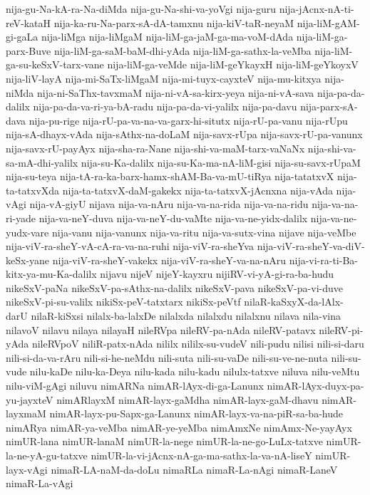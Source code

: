 {nija-gu-Na-kA-ra-Na-diMda
nija-gu-Na-shi-va-yoVgi
nija-guru
nija-jAcnx-nA-ti-reV-kataH
nija-ka-ru-Na-parx-sA-dA-tamxnu
nija-kiV-taR-neyaM
nija-liM-gAM-gi-gaLa
nija-liMga
nija-liMgaM
nija-liM-ga-jaM-ga-ma-voM-dAda
nija-liM-ga-parx-Buve
nija-liM-ga-saM-baM-dhi-yAda
nija-liM-ga-sathx-la-veMba
nija-liM-ga-su-keSxV-tarx-vane
nija-liM-ga-veMde
nija-liM-geYkayxH
nija-liM-geYkoyxV
nija-liV-layA
nija-mi-SaTx-liMgaM
nija-mi-tuyx-cayxteV
nija-mu-kitxya
nija-niMda
nija-ni-SaThx-tavxmaM
nija-ni-vA-sa-kirx-yeya
nija-ni-vA-sava
nija-pa-da-dalilx
nija-pa-da-va-ri-ya-bA-radu
nija-pa-da-vi-yalilx
nija-pa-davu
nija-parx-sA-dava
nija-pu-rige
nija-rU-pa-va-na-va-garx-hi-situtx
nija-rU-pa-vanu
nija-rUpu
nija-sA-dhayx-vAda
nija-sAthx-na-doLaM
nija-savx-rUpa
nija-savx-rU-pa-vanunx
nija-savx-rU-payAyx
nija-sha-ra-Nane
nija-shi-va-maM-tarx-vaNaNx
nija-shi-va-sa-mA-dhi-yalilx
nija-su-Ka-dalilx
nija-su-Ka-ma-nA-liM-gisi
nija-su-savx-rUpaM
nija-su-teya
nija-tA-ra-ka-barx-hamx-shAM-Ba-va-mU-tiRya
nija-tatatxvX
nija-ta-tatxvXda
nija-ta-tatxvX-daM-gakekx
nija-ta-tatxvX-jAcnxna
nija-vAda
nija-vAgi
nija-vA-giyU
nijava
nija-va-nAru
nija-va-na-rida
nija-va-na-ridu
nija-va-na-ri-yade
nija-va-neY-duva
nija-va-neY-du-vaMte
nija-va-ne-yidx-dalilx
nija-va-ne-yudx-vare
nija-vanu
nija-vanunx
nija-va-ritu
nija-va-sutx-vina
nijave
nija-veMbe
nija-viV-ra-sheY-vA-cA-ra-va-na-ruhi
nija-viV-ra-sheYva
nija-viV-ra-sheY-va-diV-keSx-yane
nija-viV-ra-sheY-vakekx
nija-viV-ra-sheY-va-na-nAru
nija-vi-ra-ti-Ba-kitx-ya-mu-Ka-dalilx
nijavu
nijeV
nijeY-kayxru
nijiRV-vi-yA-gi-ra-ba-hudu
nikeSxV-paNa
nikeSxV-pa-sAthx-na-dalilx
nikeSxV-pava
nikeSxV-pa-vi-duve
nikeSxV-pi-su-valilx
nikiSx-peV-tatxtarx
nikiSx-peVtf
nilaR-kaSxyX-da-lAlx-darU
nilaR-kiSxsi
nilalx-ba-lalxDe
nilalxda
nilalxdu
nilalxnu
nilava
nila-vina
nilavoV
nilavu
nilaya
nilayaH
nileRVpa
nileRV-pa-nAda
nileRV-patavx
nileRV-pi-yAda
nileRVpoV
niliR-patx-nAda
nililx
nililx-su-vudeV
nili-pudu
nilisi
nili-si-daru
nili-si-da-va-rAru
nili-si-he-neMdu
nili-suta
nili-su-vaDe
nili-su-ve-ne-nuta
nili-su-vude
nilu-kaDe
nilu-ka-Deya
nilu-kada
nilu-kadu
nilulx-tatxve
niluva
nilu-veMtu
nilu-viM-gAgi
niluvu
nimARNa
nimAR-lAyx-di-ga-Lanunx
nimAR-lAyx-duyx-pa-yu-jayxteV
nimARlayxM
nimAR-layx-gaMdha
nimAR-layx-gaM-dhavu
nimAR-layxmaM
nimAR-layx-pu-Sapx-ga-Lanunx
nimAR-layx-va-na-piR-sa-ba-hude
nimARya
nimAR-ya-veMba
nimAR-ye-yeMba
nimAmxNe
nimAmx-Ne-yayAyx
nimUR-lana
nimUR-lanaM
nimUR-la-nege
nimUR-la-ne-go-LuLx-tatxve
nimUR-la-ne-yA-gu-tatxve
nimUR-la-vi-jAcnx-nA-ga-ma-sathx-la-va-nA-liseY
nimUR-layx-vAgi
nimaR-LA-naM-da-doLu
nimaRLa
nimaR-La-nAgi
nimaR-LaneV
nimaR-La-vAgi
}
